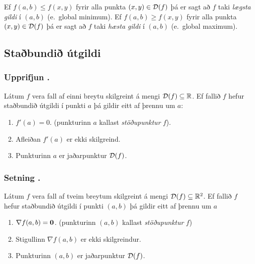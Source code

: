 \medskip
Ef $f(a,b)\leq f(x,y)$ fyrir alla punkta $(x,y)\in {\cal D}(f)$ þá er
sagt að $f$ taki {\em \color{red} lægsta gildi} í $(a,b)$ (e.~global minimum).
Ef $f(a,b)\geq f(x,y)$ fyrir alla punkta $(x,y)\in {\cal D}(f)$ þá er
sagt að $f$ taki {\em \color{red} hæsta gildi} í $(a,b)$ (e.~global maximum).






\subsection{Staðbundið útgildi} 

\subsubsection{Upprifjun \kaflanr.}
   Látum $f$ vera fall af einni breytu
skilgreint á mengi ${\cal D}(f)\subseteq {\mathbb R}$.  Ef fallið $f$ hefur
staðbundið útgildi í punkti $a$ þá gildir eitt af þrennu um $a$:

\begin {enumerate}
 \item $f'(a)=0$. \qquad (punkturinn $a$ kallast {\em \color{red} stöðupunktur} $f$).
 \item Afleiðan $f'(a)$ er ekki skilgreind.
 \item   Punkturinn $a$ er jaðarpunktur ${\cal D}(f)$.
\end {enumerate}





\subsubsection{Setning \kaflanr.}
 Látum $f$ vera fall af tveim breytum
skilgreint á mengi ${\cal D}(f)\subseteq {\mathbb R}^2$.  Ef fallið $f$ hefur
staðbundið útgildi í punkti $(a,b)$ þá gildir eitt af þrennu um $a$
\begin {enumerate}
 \item  $\nabla f(a,b)=\mbox{${\bf 0}$}$. \qquad (punkturinn $(a,b)$ kallast {\em \color{red}
     stöðupunktur} $f$) 
\item Stigullinn $\nabla f(a,b)$ er ekki skilgreindur.
\item Punkturinn $(a,b)$ er jaðarpunktur ${\cal D}(f)$.
\end {enumerate}




